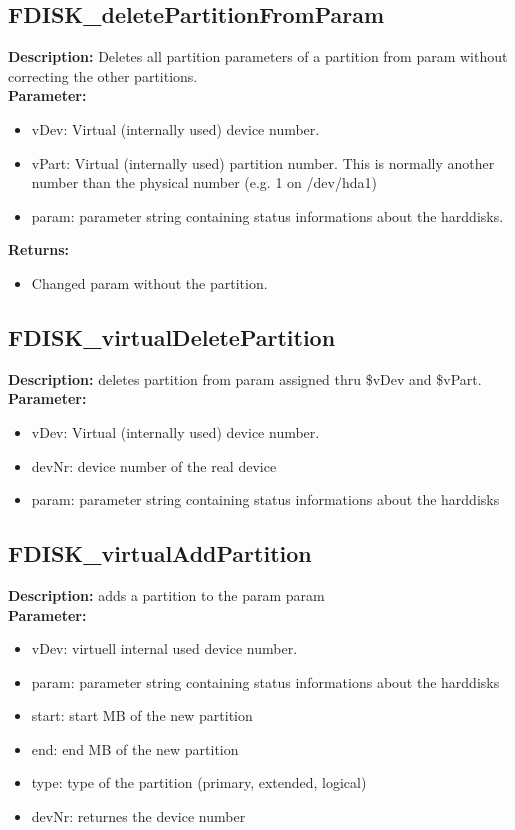 \subsection{FDISK\_deletePartitionFromParam}
\textbf{Description:} Deletes all partition parameters of a partition from param without correcting the other partitions.\\
\textbf{Parameter:}
\begin{itemize}
\item vDev: Virtual (internally used) device number.
\item vPart: Virtual (internally used) partition number. This is normally another number than the physical number (e.g. 1 on /dev/hda1)
\item param: parameter string containing status informations about the harddisks.
\end{itemize}
\textbf{Returns:}
\begin{itemize}
\item Changed param without the partition.
\end{itemize}

\subsection{FDISK\_virtualDeletePartition}
\textbf{Description:} deletes partition from param assigned thru \$vDev and \$vPart.\\
\textbf{Parameter:}
\begin{itemize}
\item vDev: Virtual (internally used) device number.
\item devNr: device number of the real device
\item param: parameter string containing status informations about the harddisks
\end{itemize}

\subsection{FDISK\_virtualAddPartition}
\textbf{Description:} adds a partition to the param param\\
\textbf{Parameter:}
\begin{itemize}
\item vDev: virtuell internal used device number.
\item param: parameter string containing status informations about the harddisks
\item start: start MB of the new partition
\item end: end MB of the new partition
\item type: type of the partition (primary, extended, logical)
\item devNr: returnes the device number
\end{itemize}


